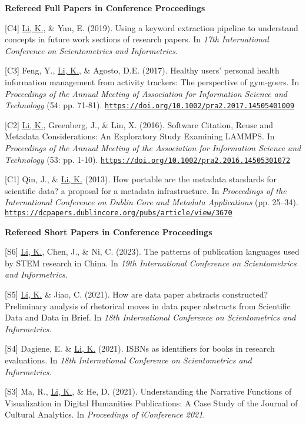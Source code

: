 \documentclass[margin, 10pt]{res} %
\begin{document}
\begin{resume}
\textbf{Refereed Full Papers in Conference Proceedings}

[C4] \underline{Li, K.}, \& Yan, E. (2019). Using a keyword extraction pipeline to understand concepts in future work sections of research papers. In \textit{17th International Conference on Scientometrics and Informetrics}.

[C3] Feng, Y., \underline{Li, K.}, \& Agosto, D.E. (2017). Healthy users’ personal health information management from activity trackers: The perspective of gym-goers. In \textit{Proceedings of the Annual Meeting of Association for Information Science and Technology} (54: pp. 71-81). \href{https://doi.org/10.1002/pra2.2017.14505401009}{\nolinkurl{https://doi.org/10.1002/pra2.2017.14505401009}}

[C2] \underline{Li, K.}, Greenberg, J., \& Lin, X. (2016). Software Citation, Reuse and Metadata Considerations: An Exploratory Study Examining LAMMPS. In \textit{Proceedings of the Annual Meeting of the Association for Information Science and Technology} (53: pp. 1-10). \href{https://doi.org/10.1002/pra2.2016.14505301072}{\nolinkurl{https://doi.org/10.1002/pra2.2016.14505301072}}

[C1] Qin, J., \& \underline{Li, K.} (2013). How portable are the metadata standards for scientific data? a proposal for a metadata infrastructure. In \textit{Proceedings of the International Conference on Dublin Core and Metadata Applications} (pp. 25–34). \href{https://dcpapers.dublincore.org/pubs/article/view/3670}{\nolinkurl{https://dcpapers.dublincore.org/pubs/article/view/3670}}

\textbf{Refereed Short Papers in Conference Proceedings}

[S6] \underline{Li, K.}, Chen, J., \& Ni, C. (2023). The patterns of publication languages used by STEM research in China. In \textit{19th International Conference on Scientometrics and Informetrics}.

[S5] \underline{Li, K.} \& Jiao, C. (2021). How are data paper abstracts constructed? Preliminary analysis of rhetorical moves in data paper abstracts from Scientific Data and Data in Brief. In \textit{18th International Conference on Scientometrics and Informetrics}.

[S4] Dagiene, E. \& \underline{Li, K.} (2021). ISBNs as identifiers for books in research evaluations. In \textit{18th International Conference on Scientometrics and Informetrics}.

[S3] Ma, R., \underline{Li, K.}, \& He, D. (2021). Understanding the Narrative Functions of Visualization in Digital Humanities Publications: A Case Study of the Journal of Cultural Analytics. In \textit{Proceedings of iConference 2021}.


\end{resume}
\end{document}
